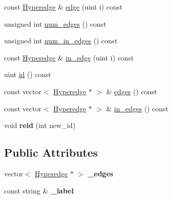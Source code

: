 \begin{DoxyCompactItemize}
\item 
const \hyperlink{classScarab_1_1HG_1_1Hyperedge}{Hyperedge} \& \hyperlink{classScarab_1_1HG_1_1HypernodeImpl_a328189f28a4185d435035686a27592c2}{edge} (uint i) const 
\item 
unsigned int \hyperlink{classScarab_1_1HG_1_1HypernodeImpl_a7fed4809706319cc916ed4c04a641436}{num\_\-edges} () const 
\item 
unsigned int \hyperlink{classScarab_1_1HG_1_1HypernodeImpl_a9a13a37fcece16603ec4bf3f364e6fcc}{num\_\-in\_\-edges} () const 
\item 
const \hyperlink{classScarab_1_1HG_1_1Hyperedge}{Hyperedge} \& \hyperlink{classScarab_1_1HG_1_1HypernodeImpl_a26ff9db30c03c7b74181e9f901aa71d4}{in\_\-edge} (uint i) const 
\item 
uint \hyperlink{classScarab_1_1HG_1_1HypernodeImpl_a2579ef1e67ad8f51d23838c130440d21}{id} () const 
\item 
const vector$<$ \hyperlink{classScarab_1_1HG_1_1Hyperedge}{Hyperedge} $\ast$ $>$ \& \hyperlink{classScarab_1_1HG_1_1HypernodeImpl_ada979dcddc1bf0abf0fc2530d1ea8761}{edges} () const 
\item 
const vector$<$ \hyperlink{classScarab_1_1HG_1_1Hyperedge}{Hyperedge} $\ast$ $>$ \& \hyperlink{classScarab_1_1HG_1_1HypernodeImpl_a77fe0de2e3927be6145cb8fc018088c9}{in\_\-edges} () const 
\item 
\hypertarget{classScarab_1_1HG_1_1HypernodeImpl_a9b0df10dfd6c20c094a928f1ced76f90}{
void {\bfseries reid} (int new\_\-id)}
\label{classScarab_1_1HG_1_1HypernodeImpl_a9b0df10dfd6c20c094a928f1ced76f90}

\end{DoxyCompactItemize}
\subsection*{Public Attributes}
\begin{DoxyCompactItemize}
\item 
\hypertarget{classScarab_1_1HG_1_1HypernodeImpl_aaa189784dcf714f3c1ca54ea8cd0dc83}{
vector$<$ \hyperlink{classScarab_1_1HG_1_1Hyperedge}{Hyperedge} $\ast$ $>$ {\bfseries \_\-edges}}
\label{classScarab_1_1HG_1_1HypernodeImpl_aaa189784dcf714f3c1ca54ea8cd0dc83}

\item 
\hypertarget{classScarab_1_1HG_1_1HypernodeImpl_aefb3b14843d6fb8ed2284ae0d6a53dbd}{
const string \& {\bfseries \_\-label}}
\label{classScarab_1_1HG_1_1HypernodeImpl_aefb3b14843d6fb8ed2284ae0d6a53dbd}

\end{DoxyCompactItemize}


